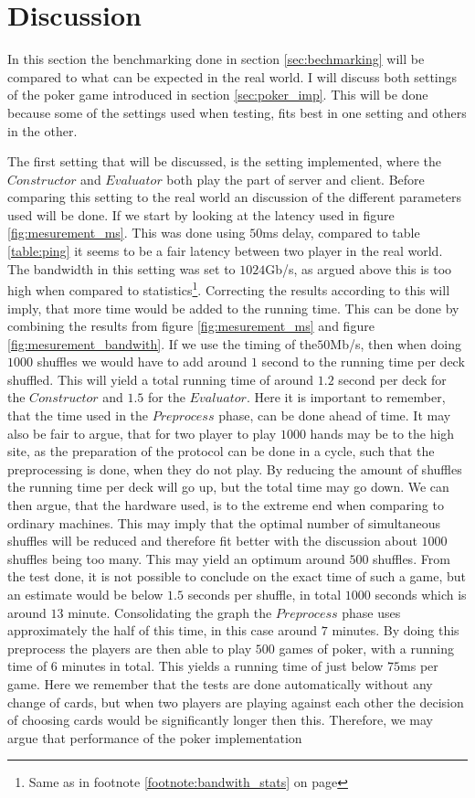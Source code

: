 \documentclass[twoside,11pt,openright]{report}
\begin{document}
\section{Discussion}
\label{sec:discussion}

In this section the benchmarking done in section \ref{sec:bechmarking} will be compared to what can be expected in the real world. I will discuss both settings of the poker game introduced in section \ref{sec:poker_imp}. This will be done because some of the settings used when testing, fits best in one setting and others in the other.

The first setting that will be discussed, is the setting implemented, where the $Constructor$ and $Evaluator$ both play the part of server and client. Before comparing this setting to the real world an discussion of the different parameters used will be done. If we start by looking at the latency used in figure \ref{fig:mesurement_ms}. This was done using $50$ms delay, compared to table \ref{table:ping} it seems to be a fair latency between two player in the real world. The bandwidth in this setting was set to $1024$Gb/s, as argued above this is too high when compared to statistics\footnote{Same as in footnote \ref{footnote:bandwith_stats} on page \pageref{footnote:bandwith_stats}}. Correcting the results according to this will imply, that more time would be added to the running time. This can be done by combining the results from figure \ref{fig:mesurement_ms} and figure \ref{fig:mesurement_bandwith}. If we use the timing of the$50$Mb/s, then when doing $1000$ shuffles we would have to add around $1$ second to the running time per deck shuffled. This will yield a total running time of around $1.2$ second per deck for the $Constructor$ and $1.5$ for the $Evaluator$. Here it is important to remember, that the time used in the $Preprocess$ phase, can be done ahead of time. It may also be fair to argue, that for two player to play $1000$ hands may be to the high site, as the preparation of the protocol can be done in a cycle, such that the preprocessing is done, when they do not play. By reducing the amount of shuffles the running time per deck will go up, but the total time may go down. We can then argue, that the hardware used, is to the extreme end when comparing to ordinary machines. This may imply that the optimal number of simultaneous shuffles will be reduced and therefore fit better with the discussion about $1000$ shuffles being too many. This may yield an optimum around $500$ shuffles. From the test done, it is not possible to conclude on the exact time of such a game, but an estimate would be below $1.5$ seconds per shuffle, in total $1000$ seconds which is around $13$ minute. Consolidating the graph the $Preprocess$ phase uses approximately the half of this time, in this case around $7$ minutes. By doing this preprocess the players are then able to play $500$ games of poker, with a running time of $6$ minutes in total. This yields a running time of just below $75$ms per game. Here we remember that the tests are done automatically without any change of cards, but when two players are playing against each other the decision of choosing cards would be significantly longer then this. Therefore, we may argue that performance of the poker implementation 
\end{document}

